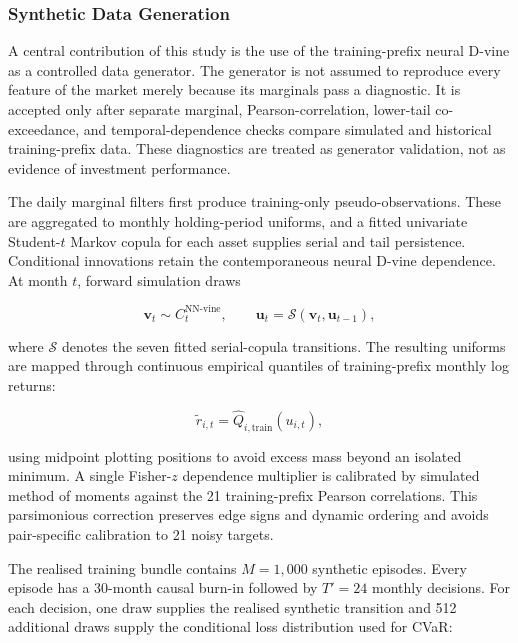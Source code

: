 \subsubsection{Synthetic Data Generation}
\label{subsubsec:3_synthetic_data_generation}

A central contribution of this study is the use of the training-prefix neural D-vine as a controlled data generator. The generator is not assumed to reproduce every feature of the market merely because its marginals pass a diagnostic. It is accepted only after separate marginal, Pearson-correlation, lower-tail co-exceedance, and temporal-dependence checks compare simulated and historical training-prefix data. These diagnostics are treated as generator validation, not as evidence of investment performance.

The daily marginal filters first produce training-only pseudo-observations. These are aggregated to monthly holding-period uniforms, and a fitted univariate Student-$t$ Markov copula for each asset supplies serial and tail persistence. Conditional innovations retain the contemporaneous neural D-vine dependence. At month $t$, forward simulation draws

\begin{equation}
\boldsymbol v_t\sim C^{\mathrm{NN\mbox{-}vine}}_t,\qquad
\boldsymbol u_t=\mathcal S(\boldsymbol v_t,\boldsymbol u_{t-1}),
\label{eq:dvine_sample}
\end{equation}

where $\mathcal S$ denotes the seven fitted serial-copula transitions. The resulting uniforms are mapped through continuous empirical quantiles of training-prefix monthly log returns:

\begin{equation}
\widetilde r_{i,t}=\widehat Q_{i,\mathrm{train}}(u_{i,t}),
\label{eq:inverse_returns}
\end{equation}

using midpoint plotting positions to avoid excess mass beyond an isolated minimum. A single Fisher-$z$ dependence multiplier is calibrated by simulated method of moments against the 21 training-prefix Pearson correlations. This parsimonious correction preserves edge signs and dynamic ordering and avoids pair-specific calibration to 21 noisy targets.

The realised training bundle contains $M=1{,}000$ synthetic episodes. Every episode has a 30-month causal burn-in followed by $T'=24$ monthly decisions. For each decision, one draw supplies the realised synthetic transition and 512 additional draws supply the conditional loss distribution used for CVaR:

